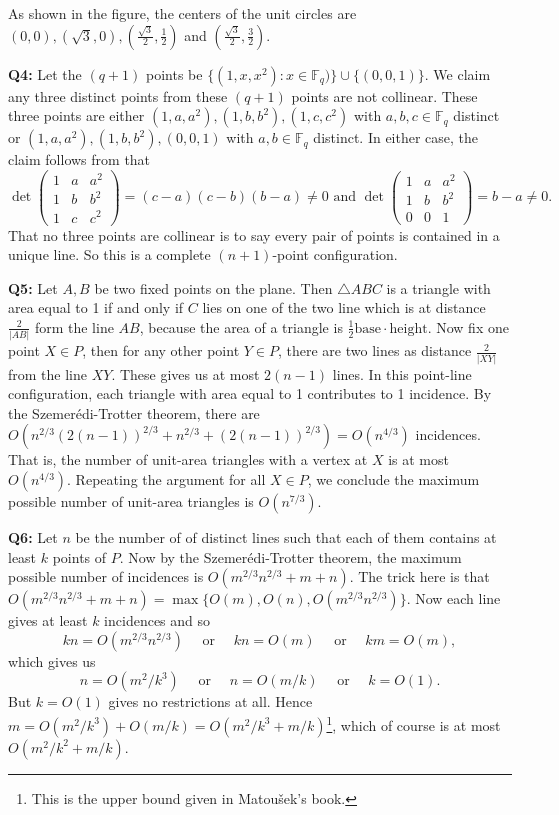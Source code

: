 \documentclass[12pt,reqno]{amsart}
\theoremstyle{definition}
\newcommand{\FF}{\mathbb{F}}
\begin{document}
As shown in the figure, the centers of the unit circles are $(0,0),(\sqrt{3},0),(\frac{\sqrt{3}}{2},\frac{1}{2})$ and $(\frac{\sqrt{3}}{2},\frac{3}{2})$.


\newpage
\noindent \textbf{Q4:} Let the $(q+1)$ points be $\{(1,x,x^2): x\in \FF_q)\}\cup\{ (0,0,1)\}$. We claim any three distinct points from these $(q+1)$ points are not collinear. These three points are either $(1,a,a^2),(1,b,b^2),(1,c,c^2)$ with $a,b,c\in \FF_q$ distinct or $(1,a,a^2),(1,b,b^2),(0,0,1)$ with $a,b\in \FF_q$ distinct. In either case, the claim follows from that \[ \det\begin{pmatrix}
    1 & a & a^2 \\
    1 & b & b^2 \\
    1 & c & c^2
  \end{pmatrix} =(c-a)(c-b)(b-a)\not= 0 \mbox{ and }  \det\begin{pmatrix}
    1 & a & a^2 \\
    1 & b & b^2 \\
    0 & 0 & 1
  \end{pmatrix} = b-a \not=0.\]
That no three points are collinear is to say every pair of points is contained in a unique line. So this is a complete $(n+1)$-point configuration.


\newpage
\noindent \textbf{Q5:} Let $A,B$ be two fixed points on the plane. Then $\triangle ABC$ is a triangle with area equal to 1 if and only  if $C$ lies on one of the two line which is at distance $\frac{2}{|AB|}$ form the line $AB$, because the area of a triangle is $\frac{1}{2}\mbox{base}\cdot\mbox{height}$. Now fix one point $X\in P$, then for any other point $Y\in P$, there are two lines as distance $\frac{2}{|XY|}$ from the line $XY$. These gives us at most $2(n-1)$ lines. In this point-line configuration, each triangle with area equal to 1 contributes to 1 incidence. By the Szemer{\' e}di-Trotter theorem, there are $O(n^{2/3}(2(n-1))^{2/3}+n^{2/3} +(2(n-1))^{2/3})=O(n^{4/3})$ incidences. That is, the number of unit-area triangles with a vertex at $X$ is at most $O(n^{4/3})$. Repeating the argument for all $X\in P$,  we conclude the maximum possible number of unit-area triangles is $O(n^{7/3})$.


\newpage
\noindent \textbf{Q6:} Let $n$ be the number of of distinct lines such that each of them contains at least $k$ points of $P$. Now by the Szemer{\' e}di-Trotter theorem, the maximum possible number of incidences is $O(m^{2/3}n^{2/3}+m+n)$. The trick here is that $O(m^{2/3}n^{2/3}+m+n)=\max\{O(m), O(n), O(m^{2/3}n^{2/3})\}$. Now each line gives at least $k$ incidences and so $$kn = O(m^{2/3}n^{2/3}) \quad\mbox{ or }\quad kn=O(m) \quad\mbox{ or }\quad km=O(m),$$ which gives us $$n=O(m^2/k^3) \quad\mbox{ or }\quad n=O(m/k) \quad\mbox{ or }\quad k=O(1).$$ But $k=O(1)$ gives no restrictions at all. Hence $m= O(m^2/k^3) +O(m/k)  = O(m^2/k^3+m/k)$\footnote{This is the upper bound given in Matou{\v{s}}ek's book.}, which of course is at most $O(m^2/k^2+m/k)$.
\end{document}

